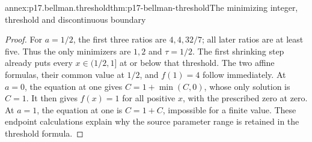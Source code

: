\begin{annexitem}{annex:p17.bellman.threshold}{thm:p17-bellman-threshold}{The minimizing integer, threshold and discontinuous boundary}
\begin{proof}
For \(a=1/2\), the first
three ratios are \(4,4,32/7\);
all later ratios are at
least five. Thus the only
minimizers are \(1,2\)
and \(\tau=1/2\).
The first shrinking step
already puts every
\(x\in(1/2,1]\) at or
below that threshold.
The two affine formulas,
their common value at
\(1/2\), and \(f(1)=4\)
follow immediately.
At \(a=0\), the equation at one gives
\(C=1+\min(C,0)\), whose only solution is
\(C=1\). It then gives \(f(x)=1\) for
all positive \(x\), with the prescribed
zero at zero. At \(a=1\), the equation
at one is \(C=1+C\), impossible for a
finite value. These endpoint calculations
explain why the source parameter range
is retained in the threshold formula.
\end{proof}
\end{annexitem}
